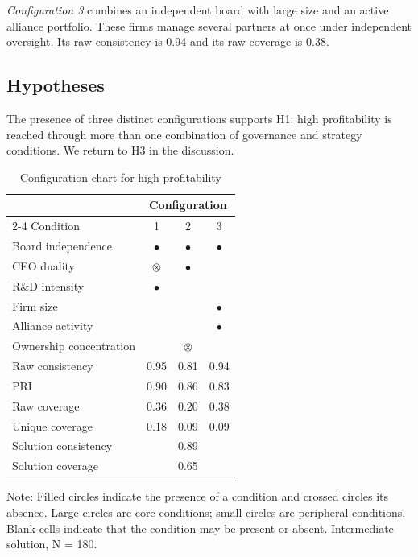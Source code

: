 \documentclass[11pt]{article}
\newcommand{\corein}{{\Large$\bullet$}}
\newcommand{\periin}{{\small$\bullet$}}
\newcommand{\coreout}{{\Large$\otimes$}}
\newcommand{\periout}{{\small$\otimes$}}
\begin{document}
\emph{Configuration 3} combines an independent board with large size and an active alliance portfolio. These firms manage several partners at once under independent oversight. Its raw consistency is 0.94 and its raw coverage is 0.38.

\subsection{Hypotheses}

The presence of three distinct configurations supports H1: high profitability is reached through more than one combination of governance and strategy conditions. We return to H3 in the discussion.

\clearpage
\setcounter{table}{2}
\begin{table}[t]
\centering
\caption{Configuration chart for high profitability}
\begin{tabular}{lccc}
\toprule
 & \multicolumn{3}{c}{Configuration} \\
\cmidrule(lr){2-4}
Condition & 1 & 2 & 3 \\
\midrule
Board independence & \corein & \corein & \corein \\
CEO duality & \coreout & \periin & \\
R\&D intensity & \corein & & \\
Firm size & & & \periin \\
Alliance activity & & & \corein \\
Ownership concentration & & \periout & \\
\midrule
Raw consistency & 0.95 & 0.81 & 0.94 \\
PRI & 0.90 & 0.86 & 0.83 \\
Raw coverage & 0.36 & 0.20 & 0.38 \\
Unique coverage & 0.18 & 0.09 & 0.09 \\
\midrule
Solution consistency & \multicolumn{3}{c}{0.89} \\
Solution coverage & \multicolumn{3}{c}{0.65} \\
\bottomrule
\end{tabular}

\smallskip
\parbox{0.8\textwidth}{\footnotesize Note: Filled circles indicate the presence of a condition and crossed circles its absence. Large circles are core conditions; small circles are peripheral conditions. Blank cells indicate that the condition may be present or absent. Intermediate solution, N = 180.}
\end{table}
\end{document}
